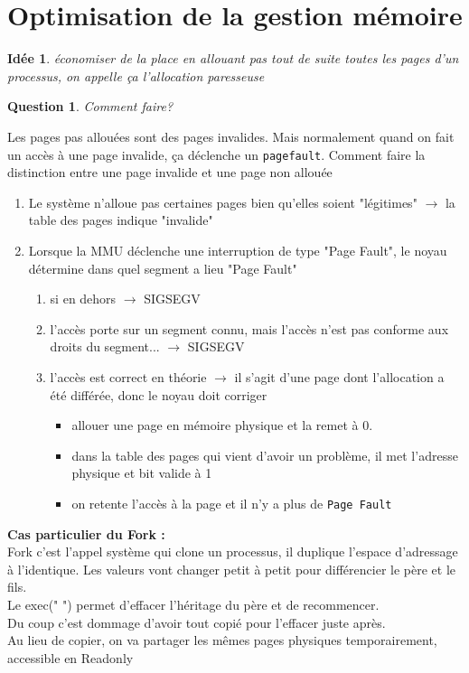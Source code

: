 \documentclass[12pt,a4paper]{report}
\newtheorem*{q}{Question}
\newtheorem*{id}{Idée}
\begin{document}
\bigskip

\section{Optimisation de la gestion mémoire}
\begin{id}économiser de la place en allouant pas tout de suite toutes les pages d'un processus, on appelle ça l'\emph{allocation paresseuse} \end{id}

\begin{q}Comment faire? \end{q}
Les pages pas allouées sont des pages invalides. Mais normalement quand on fait un accès à une page invalide, ça déclenche un \verb?pagefault?. Comment faire la distinction entre une page invalide et une page non allouée\\

\begin{enumerate}
\item Le système n'alloue pas certaines pages bien qu'elles soient "légitimes" $\rightarrow$ la table des pages indique "invalide"
\item Lorsque la MMU déclenche une interruption de type "Page Fault", le noyau détermine dans quel segment a lieu "Page Fault"
\begin{enumerate}
\item si en dehors $\rightarrow$ SIGSEGV
\item l'accès porte sur un segment connu, mais l’accès n'est pas conforme aux droits du segment... $\rightarrow$ SIGSEGV
\item l'accès est correct en théorie $\rightarrow$ il s'agit d'une page dont l'allocation a été différée, donc le noyau doit corriger
\begin{itemize}
\item[action 1 :] allouer une page en mémoire physique et la remet à 0.
\item[action 2 :] dans la table des pages qui vient d'avoir un problème, il met l'adresse physique et bit valide à 1
\item[action 3 :] on retente l'accès à la page et il n'y a plus de \verb?Page Fault?
\end{itemize}
\end{enumerate}
\end{enumerate}

\medskip
\textbf{Cas particulier du Fork :}\\
Fork c'est l'appel système qui clone un processus, il duplique l'espace d'adressage à l'identique. Les valeurs vont changer petit à petit pour différencier le père et le fils.\\
Le exec("   ") permet d'effacer l'héritage du père et de recommencer. \\
Du coup c'est dommage d'avoir tout copié pour l'effacer juste après. \\
Au lieu de copier, on va partager les mêmes pages physiques temporairement, accessible en Readonly\\
\end{document}
